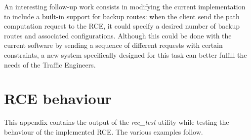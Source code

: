 \documentclass[10pt,a4paper]{report}
\begin{document}
An interesting follow-up work consists in modifying the current
implementation to include a built-in support for backup routes: when
the client send the path computation request to the RCE, it could
specify a desired number of backup routes and associated
configurations. Although this could be done with the current software
by sending a sequence of different requests with certain constraints,
a new system specifically designed for this task can better fulfill
the needs of the Traffic Engineers.

\cleardoublepage
{}
\renewcommand\bibname{References}
 \nocite{*}
 

\appendix

\chapter{RCE behaviour}
This appendix contains the output of the \textit{rce\_test} utility
while testing the behaviour of the implemented RCE\@. The various
examples follow.
\end{document}

